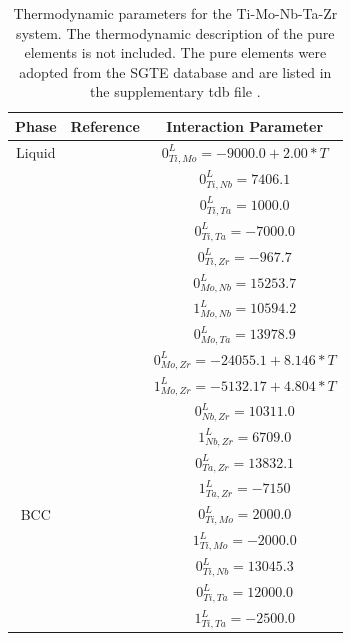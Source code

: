 \newpage
\begin{longtable}[H]{ c c c }
	\caption{Thermodynamic parameters for the Ti-Mo-Nb-Ta-Zr system. The thermodynamic description of the pure elements is not included. The pure elements were adopted from the SGTE database and are listed in the supplementary tdb file \cite{Long1998a}.}	\label{Ch3-table:ip}\\
		\hline
		Phase & Reference & Interaction Parameter\\
		\hline
		\endhead
		\hline
		\endfoot
		Liquid & \cite{Ansara1998} & $0^\textit{L}_{Ti,Mo} = -9000.0+2.00*T$\\
		          & \cite{Zhang2001} & $0^\textit{L}_{Ti,Nb} = 7406.1$\\
		          & \cite{Ansara1998} & $0^\textit{L}_{Ti,Ta} = 1000.0$\\
		          & \cite{Ansara1998} & $0^\textit{L}_{Ti,Ta} = -7000.0$\\
		          & \cite{Kumar1994a} & $0^\textit{L}_{Ti,Zr} = -967.7$\\
		          & \cite{Xiong2004} & $0^\textit{L}_{Mo,Nb} = 15253.7$\\
		          & \cite{Xiong2004} & $1^\textit{L}_{Mo,Nb} = 10594.2$\\
		          & \cite{Xiong2004} & $0^\textit{L}_{Mo,Ta} = 13978.9$\\
		          & \cite{Perez2003} & $0^\textit{L}_{Mo,Zr} = -24055.1+8.146*T$\\
		          & \cite{Perez2003} & $1^\textit{L}_{Mo,Zr} = -5132.17+4.804*T$\\
		          & \cite{Guillermet1991} & $0^\textit{L}_{Nb,Zr} = 10311.0$\\
		          & \cite{Guillermet1991} & $1^\textit{L}_{Nb,Zr} = 6709.0$\\
		          & \cite{Guillermet1995} & $0^\textit{L}_{Ta,Zr} = 13832.1$\\
		          & \cite{Guillermet1995} & $1^\textit{L}_{Ta,Zr} = -7150$\\
          BCC & \cite{Ansara1998} & $0^\textit{L}_{Ti,Mo} = 2000.0$\\
                  & \cite{Ansara1998} & $1^\textit{L}_{Ti,Mo} = -2000.0$\\
                  & \cite{Zhang2001} & $0^\textit{L}_{Ti,Nb} = 13045.3$\\
                  & \cite{Ansara1998} & $0^\textit{L}_{Ti,Ta} = 12000.0$\\
                  & \cite{Ansara1998} & $1^\textit{L}_{Ti,Ta} = -2500.0$\\

\end{longtable}
